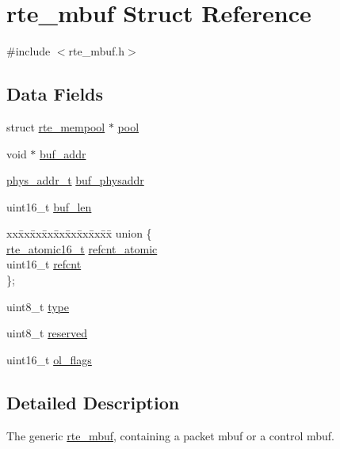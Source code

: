 \hypertarget{structrte__mbuf}{}\section{rte\+\_\+mbuf Struct Reference}
\label{structrte__mbuf}


{\ttfamily \#include $<$rte\+\_\+mbuf.\+h$>$}

\subsection*{Data Fields}
\begin{DoxyCompactItemize}
\item 
struct \hyperlink{structrte__mempool}{rte\+\_\+mempool} $\ast$ \hyperlink{structrte__mbuf_aa501505ef15ed551bf0a2ffacfc29bb5}{pool}
\item 
void $\ast$ \hyperlink{structrte__mbuf_a9db3d388a1381e68e509017a6e7d0f12}{buf\+\_\+addr}
\item 
\hyperlink{rte__memory_8h_aeed7e715f3dcfddef6f34dec94037646}{phys\+\_\+addr\+\_\+t} \hyperlink{structrte__mbuf_a6f9e031fb601226363d0106789df32f7}{buf\+\_\+physaddr}
\item 
uint16\+\_\+t \hyperlink{structrte__mbuf_a7ae671bb1805f6f7313b9301aca17eb6}{buf\+\_\+len}
\item 
\begin{tabbing}
xx\=xx\=xx\=xx\=xx\=xx\=xx\=xx\=xx\=\kill
union \{\\
\>\hyperlink{structrte__atomic16__t}{rte\_atomic16\_t} \hyperlink{structrte__mbuf_a70ad642791f0943928abe0b6270d095c}{refcnt\_atomic}\\
\>uint16\_t \hyperlink{structrte__mbuf_aeabb0685e90361917a58870b588e2e6f}{refcnt}\\
\}; \\

\end{tabbing}\item 
uint8\+\_\+t \hyperlink{structrte__mbuf_a1d127017fb298b889f4ba24752d08b8e}{type}
\item 
uint8\+\_\+t \hyperlink{structrte__mbuf_acb7bc06bed6f6408d719334fc41698c7}{reserved}
\item 
uint16\+\_\+t \hyperlink{structrte__mbuf_ad00f52c8ce94438b6190a0e501a79fab}{ol\+\_\+flags}
\end{DoxyCompactItemize}


\subsection{Detailed Description}
The generic \hyperlink{structrte__mbuf}{rte\+\_\+mbuf}, containing a packet mbuf or a control mbuf. 

